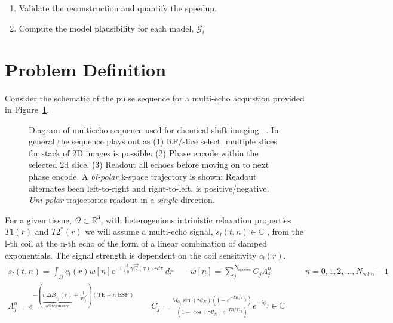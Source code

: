 \documentclass[10pt]{amsart}
\newcommand{\picdir}{./pdffig}
\begin{document}
\begin{enumerate}
\item Validate the reconstruction and quantify the speedup.
\item Compute the model plausibility for each model, $\mathcal{G}_i$

\end{enumerate}



\section{Problem Definition}
Consider the schematic of the pulse sequence for a multi-echo acquistion provided in
Figure~\ref{mfgrepulsesequence}.

\begin{figure}[h]
\centering
\scalebox{0.72}{}
\caption{Diagram of multiecho sequence used for chemical shift imaging~
\cite{Taylor2008}. In general the sequence plays out as (1) RF/slice select,
multiple slices for stack of 2D images is possible. (2) Phase encode within
the selected 2d slice. (3) Readout all echoes before moving on to next phase
encode. A \textit{bi-polar} k-space trajectory is shown: Readout alternates been left-to-right and
right-to-left, is positive/negative. \textit{Uni-polar} trajectories readout in a
\textit{single} direction.
} \label{mfgrepulsesequence}
\end{figure}


For a  given tissue, $\Omega \subset \mathbb{R}^3$,
with heterogenious intrinistic relaxation properties $T1(r)$ and $T2^*(r)$
we will assume a multi-echo signal, $s_l(t,n)\in\mathbb{C}$ ,
from the l-th coil at the n-th echo 
of the form of a linear combination of damped exponentials. 
The signal strength is dependent on the coil sensitivity $c_l(r)$.
\begin{equation}
\label{multiechosignalmodel}
\begin{split}
 s_l(t,n) = \int_\Omega c_l(r)  w[n] e^{-i \int_0^t \gamma \vec{G}(\tau)\cdot r d \tau} \; dr
\qquad
 w[n]  = \sum_j^{N_\text{species}} 
 C_j \Lambda_j^n 
  \qquad  \qquad n = 0,1,2,\dots,N_\text{echo}-1
\\
\Lambda_j^n  = e^{-\left( 
\underbrace{i\; \Delta B_{0_j}(r) }_\text{off-resonance} 
+
\frac{1}{T2^*_j} \right) \left( \text{TE} + n \; \text{ESP}\right) } 
\quad  \quad
C_j = \frac{M_{0_j} \sin \left(\gamma \theta_N \right)\left( 1- e^{-TR/T1_j}\right)}{\left( 1- \cos \left(\gamma \theta_N \right) e^{-TR/T1_j}\right)}
e^{-i  \phi_j} 
\in  \mathbb{C} 
\end{split}
\end{equation}
\end{document}
